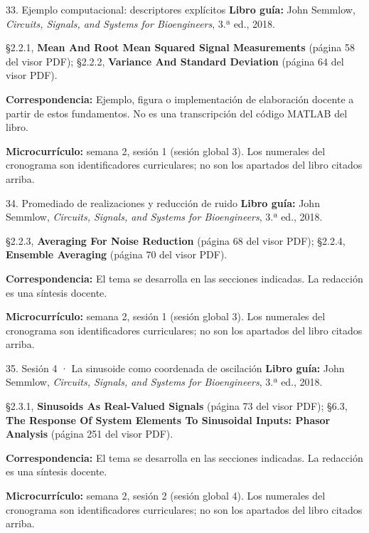 \documentclass[
  10pt,
  ignorenonframetext,
  aspectratio=169,
  spanish,
]{beamer}
\begin{document}
\begin{frame}{33. Ejemplo computacional: descriptores explícitos}
\label{ejemplo-computacional-descriptores-expluxedcitos}
\textbf{Libro guía:} John Semmlow, \emph{Circuits, Signals, and Systems
for Bioengineers}, 3.ª ed., 2018.

§2.2.1, \textbf{Mean And Root Mean Squared Signal Measurements} (página
58 del visor PDF); §2.2.2, \textbf{Variance And Standard Deviation}
(página 64 del visor PDF).

\textbf{Correspondencia:} Ejemplo, figura o implementación de
elaboración docente a partir de estos fundamentos. No es una
transcripción del código MATLAB del libro.

\textbf{Microcurrículo:} semana 2, sesión 1 (sesión global 3). Los
numerales del cronograma son identificadores curriculares; no son los
apartados del libro citados arriba.
\end{frame}

\begin{frame}{34. Promediado de realizaciones y reducción de ruido}
\label{promediado-de-realizaciones-y-reducciuxf3n-de-ruido}
\textbf{Libro guía:} John Semmlow, \emph{Circuits, Signals, and Systems
for Bioengineers}, 3.ª ed., 2018.

§2.2.3, \textbf{Averaging For Noise Reduction} (página 68 del visor
PDF); §2.2.4, \textbf{Ensemble Averaging} (página 70 del visor PDF).

\textbf{Correspondencia:} El tema se desarrolla en las secciones
indicadas. La redacción es una síntesis docente.

\textbf{Microcurrículo:} semana 2, sesión 1 (sesión global 3). Los
numerales del cronograma son identificadores curriculares; no son los
apartados del libro citados arriba.
\end{frame}

\begin{frame}{35. Sesión 4 · La sinusoide como coordenada de oscilación}
\label{sesiuxf3n-4-la-sinusoide-como-coordenada-de-oscilaciuxf3n}
\textbf{Libro guía:} John Semmlow, \emph{Circuits, Signals, and Systems
for Bioengineers}, 3.ª ed., 2018.

§2.3.1, \textbf{Sinusoids As Real-Valued Signals} (página 73 del visor
PDF); §6.3, \textbf{The Response Of System Elements To Sinusoidal
Inputs: Phasor Analysis} (página 251 del visor PDF).

\textbf{Correspondencia:} El tema se desarrolla en las secciones
indicadas. La redacción es una síntesis docente.

\textbf{Microcurrículo:} semana 2, sesión 2 (sesión global 4). Los
numerales del cronograma son identificadores curriculares; no son los
apartados del libro citados arriba.
\end{frame}
\end{document}
